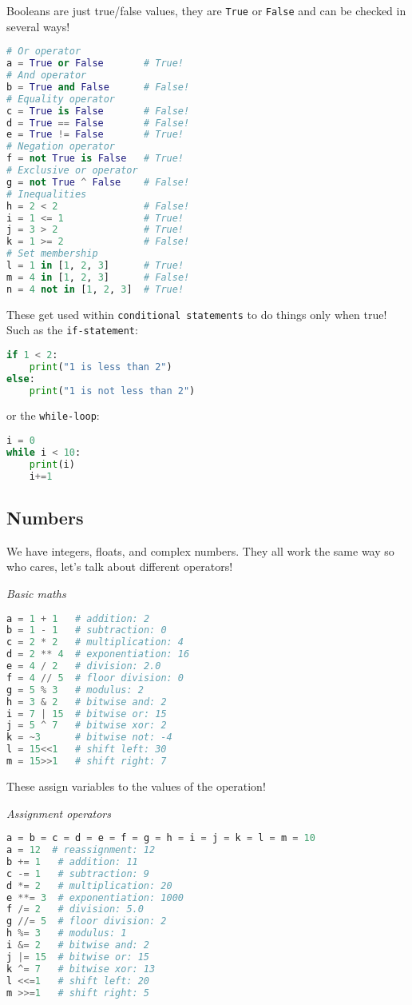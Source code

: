 \documentclass[11pt, twoside, reqno]{book}
\begin{document}
Booleans are just true/false values, they are \texttt{True} or \texttt{False} and can be checked in several ways!
\begin{lstlisting}[language=Python]
# Or operator
a = True or False       # True!
# And operator
b = True and False      # False!
# Equality operator
c = True is False       # False!
d = True == False       # False!
e = True != False       # True!
# Negation operator
f = not True is False   # True!
# Exclusive or operator
g = not True ^ False    # False! 
# Inequalities
h = 2 < 2               # False!
i = 1 <= 1              # True!
j = 3 > 2               # True!
k = 1 >= 2              # False!
# Set membership
l = 1 in [1, 2, 3]      # True!
m = 4 in [1, 2, 3]      # False!
n = 4 not in [1, 2, 3]  # True!
\end{lstlisting}

These get used within \texttt{conditional statements} to do things only when true! Such as the \texttt{if-statement}:
\begin{lstlisting}[language=Python]
if 1 < 2:
    print("1 is less than 2")
else:
    print("1 is not less than 2")
\end{lstlisting}

or the \texttt{while-loop}:
\begin{lstlisting}[language=Python]
i = 0
while i < 10:
    print(i)
    i+=1
\end{lstlisting}

\subsection{Numbers}

We have integers, floats, and complex numbers. They all work the same way so who cares, let's talk about different operators!

\textit{Basic maths}
\begin{lstlisting}[language=Python]
a = 1 + 1   # addition: 2
b = 1 - 1   # subtraction: 0
c = 2 * 2   # multiplication: 4
d = 2 ** 4  # exponentiation: 16
e = 4 / 2   # division: 2.0
f = 4 // 5  # floor division: 0
g = 5 % 3   # modulus: 2
h = 3 & 2   # bitwise and: 2
i = 7 | 15  # bitwise or: 15
j = 5 ^ 7   # bitwise xor: 2
k = ~3      # bitwise not: -4
l = 15<<1   # shift left: 30
m = 15>>1   # shift right: 7
\end{lstlisting}

These assign variables to the values of the operation!

\textit{Assignment operators}
\begin{lstlisting}[language=Python]
a = b = c = d = e = f = g = h = i = j = k = l = m = 10
a = 12  # reassignment: 12
b += 1   # addition: 11
c -= 1   # subtraction: 9
d *= 2   # multiplication: 20
e **= 3  # exponentiation: 1000
f /= 2   # division: 5.0
g //= 5  # floor division: 2
h %= 3   # modulus: 1
i &= 2   # bitwise and: 2
j |= 15  # bitwise or: 15
k ^= 7   # bitwise xor: 13
l <<=1   # shift left: 20
m >>=1   # shift right: 5
\end{lstlisting}
\end{document}
